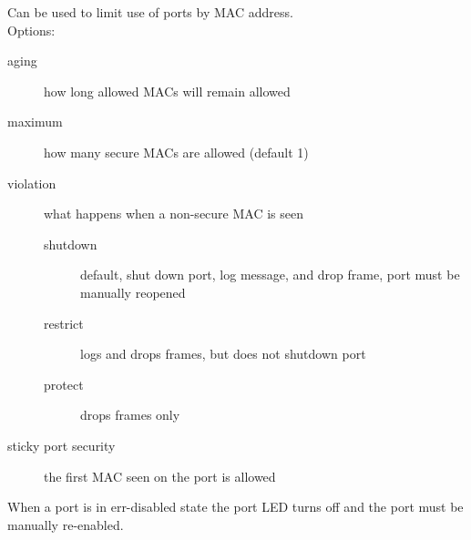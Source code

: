 Can be used to limit use of ports by MAC address.\\

Options:

\begin{description}

\item[aging]
how long allowed MACs will remain allowed

\item[maximum]
how many secure MACs are allowed (default 1)

\item[violation]
what happens when a non-secure MAC is seen

\begin{description}

\item[shutdown]
default, shut down port, log message, and drop frame, port must be manually
reopened

\item[restrict]
logs and drops frames, but does not shutdown port

\item[protect]
drops frames only

\end{description}

\end{description}

\begin{description}

\item[sticky port security]
the first MAC seen on the port is allowed

\end{description}

When a port is in err-disabled state the port LED turns off and the port
must be manually re-enabled.
